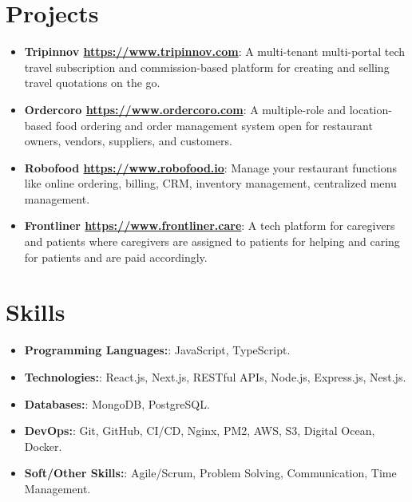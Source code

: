 \documentclass[letterpaper,11pt]{article}
\newcommand{\resumeItem}[2]{
  \item\small{
    \textbf{#1}{: #2 \vspace{-2pt}}
  }
}
\newcommand{\resumeSubItem}[2]{\resumeItem{#1}{#2}\vspace{-4pt}}
\newcommand{\resumeSubHeadingListStart}{\begin{itemize}[leftmargin=*]}
\newcommand{\resumeSubHeadingListEnd}{\end{itemize}}
\begin{document}
\section{Projects}
  \resumeSubHeadingListStart
    \resumeSubItem{Tripinnov \href{https://tripinnov.com/}{https://www.tripinnov.com}}
      {A multi-tenant multi-portal tech travel subscription and commission-based platform for creating and selling travel quotations on the go.}
    \resumeSubItem{Ordercoro \href{https://ordercoro.com/}{https://www.ordercoro.com}}
      {A multiple-role and location-based food ordering and order management system open for restaurant owners, vendors, suppliers, and customers.}
    \resumeSubItem{Robofood \href{https://robofood.io/}{https://www.robofood.io}}
      {Manage your restaurant functions like online ordering, billing, CRM, inventory management, centralized menu management.}
    \resumeSubItem{Frontliner \href{https://frontliner.care/}{https://www.frontliner.care}}
      {A tech platform for caregivers and patients where caregivers are assigned to patients for helping and caring for patients and are paid accordingly.}
  \resumeSubHeadingListEnd

%
\section{Skills}
 \resumeSubHeadingListStart
    \resumeSubItem{Programming Languages:} {JavaScript, TypeScript.}
    \resumeSubItem{Technologies:} {React.js, Next.js, RESTful APIs, Node.js, Express.js, Nest.js.}
    \resumeSubItem{Databases:} {MongoDB, PostgreSQL.}
    \resumeSubItem{DevOps:} {Git, GitHub, CI/CD, Nginx, PM2, AWS, S3, Digital Ocean, Docker.}
    \resumeSubItem{Soft/Other Skills:} {Agile/Scrum, Problem Solving, Communication, Time Management.}
 \resumeSubHeadingListEnd

\end{document}
